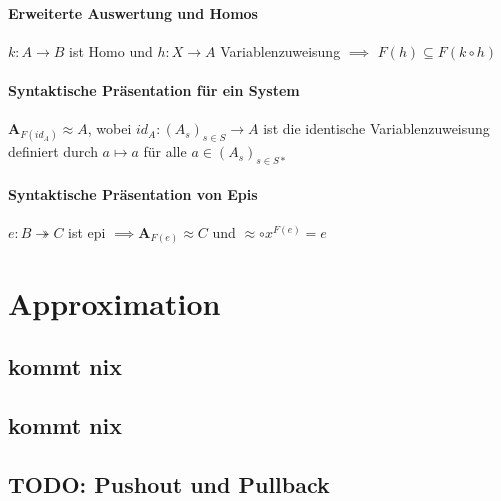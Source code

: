 \paragraph{ Erweiterte Auswertung und Homos}
$k: A \rightarrow B$ ist Homo und $h: X \rightarrow A$ Variablenzuweisung $\implies $ $F(h) \subseteq F(k \circ h)$

\paragraph{ Syntaktische Präsentation für ein System}
$\mathbf{A}_{F(id_A)} \approx A$, wobei $id_A: (A_s)_{s \in S} \rightarrow A$ ist die identische Variablenzuweisung definiert durch $a \mapsto a$ für alle $a \in (A_s)_{s \in S*}$

\paragraph{ Syntaktische Präsentation von Epis}
$e: B \twoheadrightarrow C$ ist epi $\implies \mathbf{A}_{F(e)} \approx C$ und $\approx \circ x^{F(e)} = e$


\section{Approximation}
\subsection{kommt nix}
\subsection{kommt nix}
\subsection{TODO: Pushout und Pullback}



